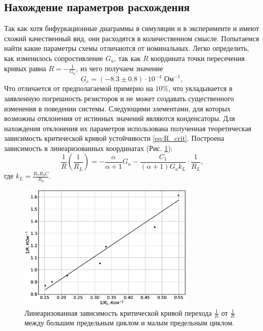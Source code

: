 \documentclass[12pt]{article}
\begin{document}
\subsection*{Нахождение параметров расхождения}
Так как хотя бифуркационные диаграммы в симуляции и в эксперименте и имеют схожий качественный вид, они
расходятся в количественном смысле. Попытаемся найти какие параметры схемы отличаются от номинальных.
Легко определить, как изменилось сопростивление $G_a$, так как $R$ координата точки пересечения кривых
равна $R = -\frac{1}{G_a}$, из чего получаем значение
\[
	G_e = (-8.3 \pm 0.8) \cdot 10^{-4} \text{ Ом}^{-1},
\]
Что отличается от предполагаемой примерно на $10\%$, что укладывается в заявленную погрешность резисторов и
не может создавать существенного изменения в поведении системы.
Следующими элементами, для которых возможны отклонения от истинных значений являются конденсаторы.
Для нахождения отклонения их параметров использована полученная теоретическая зависимость критической кривой устойчивости \ref{eq:R_crit}.
Построена зависимость в линеаризованных координатах (Рис. \ref{fig:fit_coefs_line}):
\[
	\frac{1}{R} \left( \frac{1}{R_L} \right) = -\frac{\alpha}{\alpha + 1} G_a - \frac{C_1}{(\alpha + 1) G_a k_L} \cdot \frac{1}{R_L},
\]
где $k_L = \frac{R_7 R_9 C}{R_8}$.

\begin{figure}[H]
	\centering
	\includegraphics[width=0.75\textwidth]{fit_coefs_linear.eps}
	\caption{Линеаризованная зависимость критической кривой перехода $\frac{1}{R}$ от $\frac{1}{R}$
		между большим предельным циклом и малым предельным циклом.}
	\label{fig:fit_coefs_line}
\end{figure}
\end{document}
